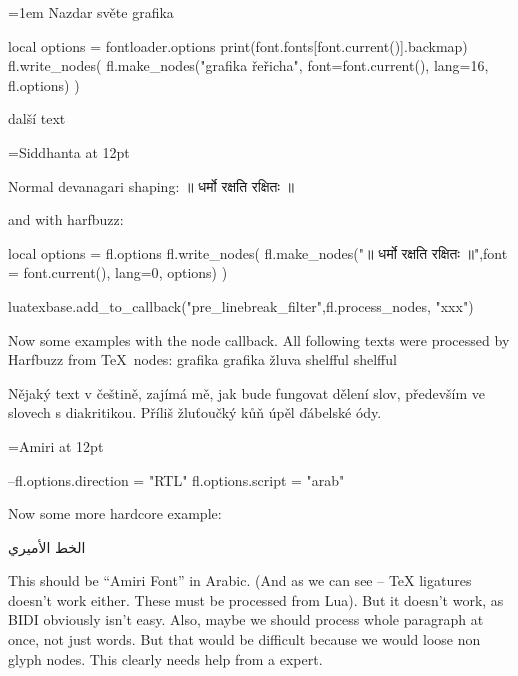 \documentclass{article}
\begin{document}
\parindent=0pt
\parskip=1em
\ahoj Nazdar světe grafika
\begin{luacode*}
  local options = fontloader.options
  print(font.fonts[font.current()].backmap)
  fl.write_nodes(
    fl.make_nodes("grafika řeřicha", {font=font.current(), lang=16}, fl.options)
  )
\end{luacode*}

další text

\frenchspacing %

\font\siddhanta={Siddhanta} at 12pt
\bigskip

\siddhanta 

Normal devanagari shaping: ॥ धर्मो रक्षति रक्षितः ॥

and with harfbuzz: 
\begin{luacode*}
  local options = fl.options
fl.write_nodes(
  fl.make_nodes("॥ धर्मो रक्षति रक्षितः ॥",{font = font.current(), lang=0}, options)
 )
\end{luacode*}

\ahoj

\begin{luacode*}
luatexbase.add_to_callback("pre_linebreak_filter",fl.process_nodes, "xxx")
\end{luacode*}

Now some examples with the node callback. All following texts were processed by
Harfbuzz from TeX\ nodes: grafika graf\/ika žluva shelfful shelf\/ful


Nějaký text v češtině, zajímá mě, jak bude fungovat dělení slov, především ve
slovech s diakritikou. Příliš žluťoučký kůň úpěl ďábelské ódy. 


\font\amiri={Amiri} at 12pt
\amiri
\begin{luacode*}
--fl.options.direction = "RTL"
fl.options.script = "arab"
\end{luacode*}
Now some more hardcore example:


الخط الأميري

This should be ``Amiri Font'' in Arabic. (And as we can see -- TeX ligatures
doesn't work either. These must be processed from Lua). But it doesn't work, as
BIDI obviously isn't easy. Also, maybe we should process whole paragraph at
once, not just words. But that would be difficult because we would loose non
glyph nodes. This clearly needs help from a expert.
\end{document}
